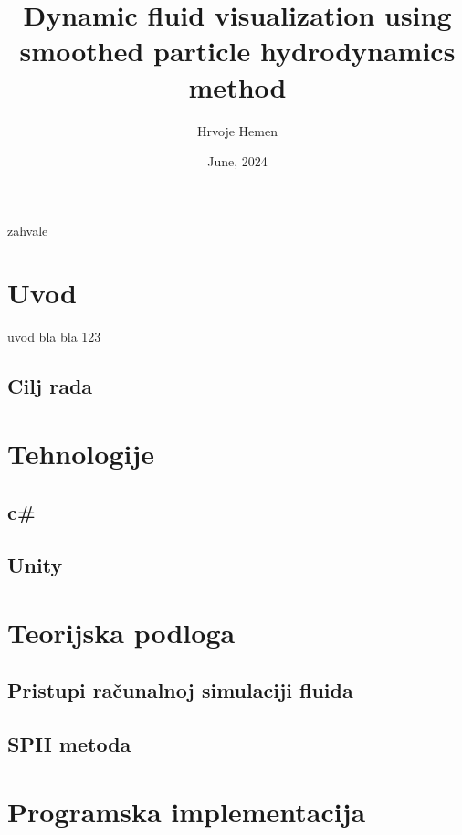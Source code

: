 \documentclass[diplomskirad]{fer}
\title{Dynamic fluid visualization using smoothed particle hydrodynamics method}
\author{Hrvoje Hemen}
\date{June, 2024}
\begin{document}
    \maketitle
    \begin{zahvale}
        zahvale
    \end{zahvale}
    \mainmatter
    \tableofcontents
    \chapter{Uvod}\label{ch:uvod}
    uvod bla bla 123

    \section{Cilj rada}\label{sec:cilj-rada}

    \chapter{Tehnologije}\label{ch:tehnologije}

    \section{c\#}\label{sec:c}

    \section{Unity}\label{sec:unity}



    \chapter{Teorijska podloga}\label{ch:teorijska-podloga}

    \section{Pristupi računalnoj simulaciji fluida}\label{sec:pristupi-racunalnoj-simulaciji-fluida}

    \section{SPH metoda}\label{sec:sph-metoda}


    \chapter{Programska implementacija}\label{ch:programska-implementacija}
\end{document}
